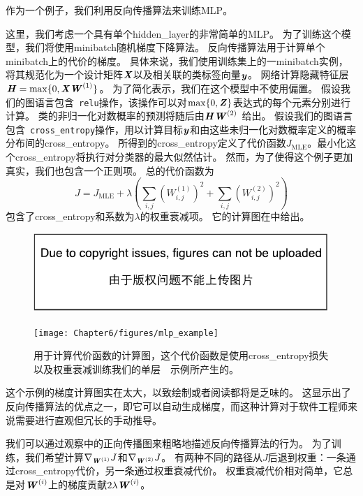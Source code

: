 作为一个例子，我们利用反向传播算法来训练\gls{MLP}。

这里，我们考虑一个具有单个\gls{hidden_layer}的非常简单的\gls{MLP}。
为了训练这个模型，我们将使用\gls{minibatch}随机梯度下降算法。
反向传播算法用于计算单个\gls{minibatch}上的代价的梯度。
具体来说，我们使用训练集上的一\gls{minibatch}实例，将其规范化为一个设计矩阵$\boldsymbol{\mathit{X}}$以及相关联的类标签向量$\boldsymbol{\mathit{y}}$。
网络计算隐藏特征层$\boldsymbol{\mathit{H}}=\max\{0, \boldsymbol{\mathit{X}}\boldsymbol{\mathit{W}}^{(1)}\}$。
为了简化表示，我们在这个模型中不使用偏置。
假设我们的图语言包含~\verb|relu|操作，该操作可以对$\max\{0,\boldsymbol{\mathit{Z}}\}$表达式的每个元素分别进行计算。
类的非归一化对数概率的预测将随后由$\boldsymbol{\mathit{H}}\boldsymbol{\mathit{W}}^{(2)}$ 给出。
假设我们的图语言包含~\verb|cross_entropy|操作，用以计算目标$\boldsymbol{\mathit{y}}$和由这些未归一化对数概率定义的概率分布间的\gls{cross_entropy}。
所得到的\gls{cross_entropy}定义了代价函数$J_\text{MLE}$。最小化这个\gls{cross_entropy}将执行对分类器的最大似然估计。
然而，为了使得这个例子更加真实，我们也包含一个正则项。
总的代价函数为
\begin{equation}
  J = J_{\text{MLE}} + \lambda \left ( \sum_{i, j} \left (W_{i, j}^{(1)} \right )^2 + \sum_{i, j} \left (W_{i, j}^{(2)} \right)^2 \right )
\end{equation}
包含了\gls{cross_entropy}和系数为$\lambda$的权重衰减项。
它的计算图在中给出。
\begin{figure}[!htb]
\ifOpenSource
\centerline{\includegraphics{figure.pdf}}
\else
\centerline{\texttt{[image: Chapter6/figures/mlp\_example]}}
\fi
\caption{用于计算代价函数的计算图，这个代价函数是使用\gls{cross_entropy}损失以及权重衰减训练我们的单层~~示例所产生的。}
\label{fig:chap6_mlp_example}
\end{figure}

这个示例的梯度计算图实在太大，以致绘制或者阅读都将是乏味的。
这显示出了反向传播算法的优点之一，即它可以自动生成梯度，而这种计算对于软件工程师来说需要进行直观但冗长的手动推导。

我们可以通过观察中的正向传播图来粗略地描述反向传播算法的行为。
为了训练，我们希望计算$\nabla_{\boldsymbol{\mathit{W}}^{(1)}} J$和$\nabla_{\boldsymbol{\mathit{W}}^{(2)}} J$。
有两种不同的路径从$J$后退到权重：一条通过\gls{cross_entropy}代价，另一条通过权重衰减代价。
权重衰减代价相对简单，它总是对$\boldsymbol{\mathit{W}}^{(i)}$上的梯度贡献$2\lambda \boldsymbol{\mathit{W}}^{(i)}$。
  
